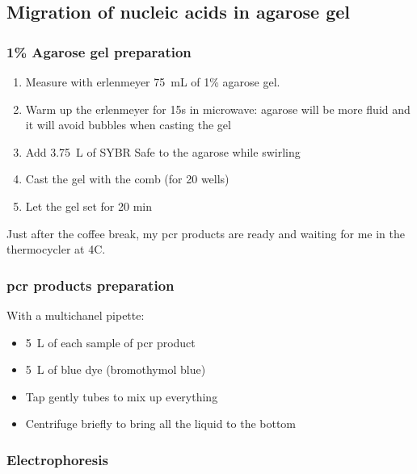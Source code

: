 \subsection{Migration of nucleic acids in agarose gel}
\label{task:20180130_cj1}

\subsubsection{1\% Agarose gel preparation}

\begin{enumerate}
\item Measure with erlenmeyer 75~mL of 1\% agarose gel.
\item Warm up the erlenmeyer for 15s in microwave: agarose will be more fluid and it will avoid bubbles when casting the gel
\item Add 3.75~\textmu L of SYBR Safe to the agarose while swirling 
\item Cast the gel with the comb (for 20 wells)
\item Let the gel set for 20 min
\end{enumerate}

Just after the coffee break, my \gls{pcr} products are ready and waiting for me in the thermocycler at 4\degree C. 

\subsubsection{\gls{pcr} products preparation}

With a multichanel pipette:
\begin{itemize}
\item 5~\textmu L of each sample of \gls{pcr} product
\item 5~\textmu L of blue dye (bromothymol blue)
\item Tap gently tubes to mix up everything
\item Centrifuge briefly to bring all the liquid to the bottom
\end{itemize}

\subsubsection{Electrophoresis}

